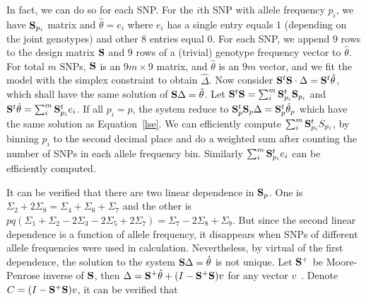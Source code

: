 \documentclass[11pt,Times]{article}
\def\cite{\citep}
\begin{document}
\vspace{.1in} 
In fact, we can do so for each SNP. For the $i$th SNP with allele frequency $p_i$, we have $\S_{p_i}$ matrix and $\hat{\theta}=e_i$ where $e_i$ has a single entry equals $1$ (depending on the joint genotypes) and other $8$ entries equal $0$.  For each SNP, we append $9$ rows to the design matrix $\S$ and $9$ rows of a (trivial) genotype frequency vector to $\hat\theta$. For total $m$ SNPs, $\S$ is an $9m \times 9$ matrix, and $\hat{\theta}$ is an $9m$ vector, and we fit the model with the simplex constraint to obtain $\hat{\Delta}$.  
%
Now consider $\S^t \S \cdot \Delta = \S^t \hat\theta$, which shall have the same solution of $\S \Delta = \hat\theta$.  Let $\S^t \S = \sum_i^m \S_{p_i}^t \S_{p_i}$ and $\S^t \hat\theta = \sum_i^m \S_{p_i}^t e_i$. If all $p_i = p$, the system reduce to $\S_p^t \S_p \Delta =\S_p^t \hat\theta_{p}$ which have the same solution as Equation~\eqref{lse}.  We can efficiently compute $\sum_i^m \S_{p_i}^t S_{p_i}$, by binning $p_i$ to the second decimal place and do a weighted sum after counting the number of SNPs in each allele frequency bin.  Similarly  $\sum_i^m \S_{p_i}^t e_i$ can be efficiently computed. 



\vspace{.1in} 
It can be verified that there are two linear dependence in $\S_p$. One is  $\Sigma_2 + 2 \Sigma_8 = \Sigma_4 + \Sigma_6 + \Sigma_7$ and the other is $pq (\Sigma_1+\Sigma_2- 2\Sigma_3 - 2\Sigma_5 + 2\Sigma_7)  =  \Sigma_7 - 2 \Sigma_8 +  \Sigma_9$. But since the second linear dependence is a function of allele frequency, it disappears when SNPs of different allele frequencies were used in calculation. Nevertheless, by virtual of the first dependence, the solution to the system $\S \Delta = \hat\theta$ is not unique. Let $\S^{+}$ be Moore-Penrose inverse of $\S$, then $\Delta = \S^{+} \hat\theta + (I - \S^{+} \S) v$ for any vector $v$~\cite{penrose.55}.  Denote $C = (I - \S^{+} \S) v$,  it can be verified that  
\end{document}
